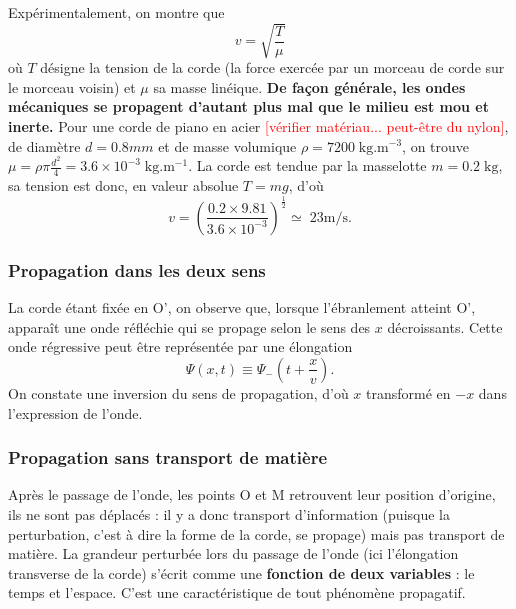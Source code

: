 \documentclass[11pt,a4paper]{report}
\begin{document}
Expérimentalement, on montre que
\begin{equation}
	v = \sqrt{\frac{T}{\mu}}
\end{equation}
où $T$ désigne la tension de la corde (la force exercée par un morceau de corde sur le morceau voisin) et $\mu$ sa masse linéique. \textbf{De façon générale, les ondes mécaniques se propagent d'autant plus mal que le milieu est mou et inerte.} Pour une corde de piano en acier \textcolor{red}{[vérifier matériau... peut-être du nylon]}, de diamètre $d = 0.8 mm$ et de masse volumique $\rho = 7200\;\text{kg}.\text{m}^{-3}$, on trouve $\mu = \rho \pi \frac{d^2}{4} = 3.6 \times 10^{-3}\;\text{kg}.\text{m}^{-1}$. La corde est tendue par la masselotte $m = 0.2\;\text{kg}$, sa tension est donc, en valeur absolue $T = mg$, d'où
\begin{equation}
	v = \left(\frac{0.2\times 9.81}{3.6 \times 10^{-3}}\right)^{\frac{1}{2}} \simeq\;23 \text{m}/\text{s}.
\end{equation}

\subsubsection{Propagation dans les deux sens}

La corde étant fixée en O', on observe que, lorsque l'ébranlement atteint O', apparaît une onde réfléchie qui se propage selon le sens des $x$ décroissants. Cette onde régressive peut être représentée par une élongation
\begin{equation}
	\Psi(x,t) \equiv \Psi_-\left(t + \frac{x}{v}\right).
\end{equation}
On constate une inversion du sens de propagation, d'où $x$ transformé en $-x$ dans l'expression de l'onde.

\subsubsection{Propagation sans transport de matière}

Après le passage de l'onde, les points O et M retrouvent leur position d'origine, ils ne sont pas déplacés : il y a donc transport d'information (puisque la perturbation, c'est à dire la forme de la corde, se propage) mais pas transport de matière. La grandeur perturbée lors du passage de l'onde (ici l'élongation transverse de la corde) s'écrit comme une \textbf{fonction de deux variables} : le temps et l'espace. C'est une caractéristique de tout phénomène propagatif.
 
\end{document}

